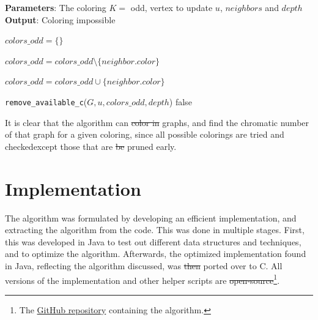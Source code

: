 \documentclass{article}
\providecommand{\DIFaddtex}[1]{{\protect\color{blue}\uwave{#1}}} %
\providecommand{\DIFdeltex}[1]{{\protect\color{red}\sout{#1}}}                      %
\providecommand{\DIFaddbegin}{} %
\providecommand{\DIFaddend}{} %
\providecommand{\DIFdelbegin}{} %
\providecommand{\DIFdelend}{} %
\providecommand{\DIFadd}[1]{\texorpdfstring{\DIFaddtex{#1}}{#1}} %
\providecommand{\DIFdel}[1]{\texorpdfstring{\DIFdeltex{#1}}{}} %
\newcommand{\DIFscaledelfig}{0.5}
\newlength{\DIFdelgraphicswidth} %
\newlength{\DIFdelgraphicsheight} %
\newcommand{\DIFaddincludegraphics}[2][]{{\color{blue}\fbox{\DIFOincludegraphics[#1]{#2}}}} %
\newcommand{\DIFdelincludegraphics}[2][]{%
\sbox{\DIFdelgraphicsbox}{\DIFOincludegraphics[#1]{#2}}%
\settoboxwidth{\DIFdelgraphicswidth}{\DIFdelgraphicsbox} %
\settoboxtotalheight{\DIFdelgraphicsheight}{\DIFdelgraphicsbox} %
\scalebox{\DIFscaledelfig}{%
\parbox[b]{\DIFdelgraphicswidth}{\usebox{\DIFdelgraphicsbox}\\[-\baselineskip] \rule{\DIFdelgraphicswidth}{0em}}\llap{\resizebox{\DIFdelgraphicswidth}{\DIFdelgraphicsheight}{%
\setlength{\unitlength}{\DIFdelgraphicswidth}%
\begin{picture}(1,1)%
\thicklines\linethickness{2pt} %
{\color[rgb]{1,0,0}\put(0,0){\framebox(1,1){}}}%
{\color[rgb]{1,0,0}\put(0,0){\line( 1,1){1}}}%
{\color[rgb]{1,0,0}\put(0,1){\line(1,-1){1}}}%
\end{picture}%
}\hspace*{3pt}}} %
} %
\DeclareRobustCommand{\DIFaddbegin}{\DIFOaddbegin \let\includegraphics\DIFaddincludegraphics} %
\DeclareRobustCommand{\DIFaddend}{\DIFOaddend \let\includegraphics\DIFOincludegraphics} %
\DeclareRobustCommand{\DIFdelbegin}{\DIFOdelbegin \let\includegraphics\DIFdelincludegraphics} %
\DeclareRobustCommand{\DIFdelend}{\DIFOaddend \let\includegraphics\DIFOincludegraphics} %
\begin{document}
\begin{algorithm}[tb]
	\caption{\texttt{handle\_special\_case\_odd}}
	\label{alg:special}
	\textbf{Parameters}: The coloring $K = $ odd, vertex to update $u$, $neighbors$ and $depth$ \\
	\textbf{Output}: Coloring impossible
	\begin{algorithmic}[1]
		\STATE $colors\_odd = \{\}$


		\STATE $colors\_odd = colors\_odd \setminus \{neighbor.color\}$

		\ELSE 

		\STATE $colors\_odd = colors\_odd \cup \{neighbor.color\}$
		\ENDIF

		\ENDFOR


		\RETURN \texttt{remove\_available\_c}($G, u, colors\_odd, depth$)
		\ENDIF
		\RETURN false
	\end{algorithmic}
\end{algorithm}

It is clear that the algorithm can \DIFdelbegin \DIFdel{color in }\DIFdelend \DIFaddbegin \DIFadd{correctly color }\DIFaddend graphs, and find the chromatic number of that graph for a given coloring, since all possible colorings are tried and checked\DIFaddbegin \DIFadd{, }\DIFaddend except those that are \DIFdelbegin \DIFdel{be }\DIFdelend pruned early.

\section{Implementation}
\label{sec:implementation}

The algorithm was formulated by developing an efficient implementation, and extracting the algorithm from the code. This was done in multiple stages. First, this was developed in Java to test out different data structures and techniques, and to optimize the algorithm. Afterwards, the optimized implementation found in Java, reflecting the algorithm discussed, was \DIFdelbegin \DIFdel{then }\DIFdelend ported over to C. All versions of the implementation and other helper scripts are \DIFdelbegin \DIFdel{open-source}\DIFdelend \DIFaddbegin \DIFadd{open source}\DIFaddend \footnote{The \href{https://github.com/ArneClaerhout/color_planar_graphs}{GitHub repository} containing the algorithm.}.
\end{document}
